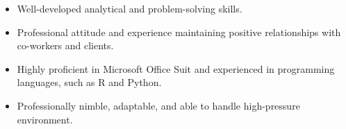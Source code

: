 
\begin{cvparagraph}
\begin{itemize}
    \item Well-developed analytical and problem-solving skills.
    \item Professional attitude and experience maintaining positive relationships with co-workers and clients.
    \item Highly proficient in Microsoft Office Suit and experienced in programming languages, such as R and Python.
    \item Professionally nimble, adaptable, and able to handle high-pressure environment.
\end{itemize}
\end{cvparagraph}